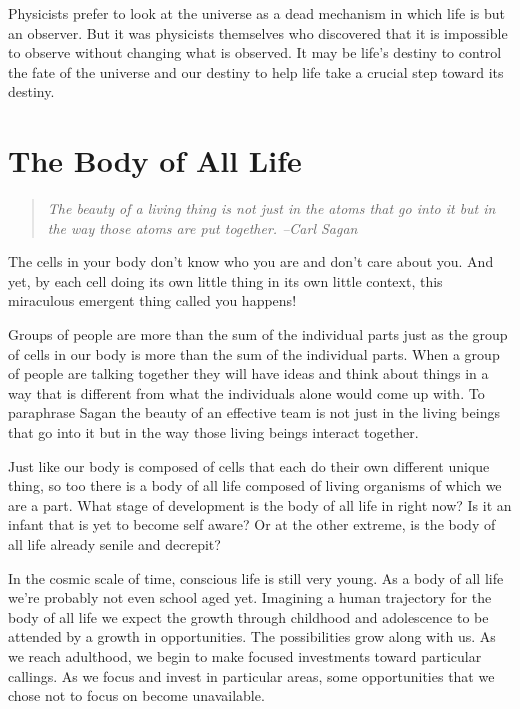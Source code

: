 \documentclass[ebook,11pt,openany,twoside,showtrims]{memoir}
\begin{document}
Physicists prefer to look at the universe as a dead mechanism in which life is
but an observer. But it was physicists themselves who discovered that it is
impossible to observe without changing what is observed. It may be life's
destiny to control the fate of the universe and our destiny to help life take a
crucial step toward its destiny.

\chapter{The Body of All Life}

\begin{quote}
\em
The beauty of a living thing is not just in the atoms that go into it but in
the way those atoms are put together. --Carl Sagan
\end{quote}

The cells in your body don't know who you are and don't care about you. And
yet, by each cell doing its own little thing in its own little context, this
miraculous emergent thing called you happens!

Groups of people are more than the sum of the individual parts just as the
group of cells in our body is more than the sum of the individual parts. When a
group of people are talking together they will have ideas and think about
things in a way that is different from what the individuals alone would come up
with. To paraphrase Sagan the beauty of an effective team is not just in the
living beings that go into it but in the way those living beings interact
together.

Just like our body is composed of cells that each do their own different unique
thing, so too there is a body of all life composed of living organisms of which
we are a part. What stage of development is the body of all life in right now?
Is it an infant that is yet to become self aware? Or at the other extreme, is
the body of all life already senile and decrepit?

In the cosmic scale of time, conscious life is still very young. As a body of
all life we're probably not even school aged yet. Imagining a human trajectory
for the body of all life we expect the growth through childhood and adolescence
to be attended by a growth in opportunities. The possibilities grow along with
us. As we reach adulthood, we begin to make focused investments toward
particular callings. As we focus and invest in particular areas, some
opportunities that we chose not to focus on become unavailable.
\end{document}

